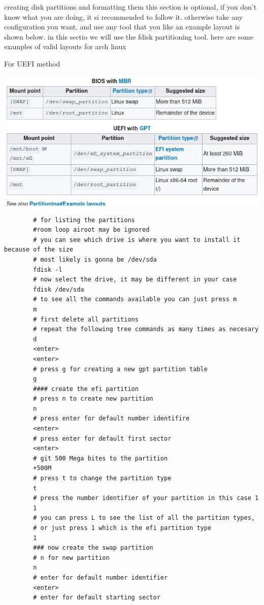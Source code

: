 \newpage
\begin{section}{creating disk partitions and formatting them}
	this section is optional, if you don't know what you are doing, it si recommended to follow it.
	otherwise take any configuration you want, and use any tool that you like
	an example layout is shown below.
	in this sectio we will use the fdisk partitioning tool.
	here are some examples of valid layouts for arch linux
	\begin{Large}
		\begin{center}
			For UEFI method
		\end{center}
	\end{Large}
	\includegraphics{partitionTablesExamples.png}
	\begin{verbatim}
		# for listing the partitions
		#room loop airoot may be ignored
		# you can see which drive is where you want to install it because of the size
		# most likely is gonna be /dev/sda
		fdisk -l
		# now select the drive, it may be different in your case
		fdisk /dev/sda
		# to see all the commands available you can just press m
		m
		# first delete all partitions
		# repeat the following tree commands as many times as necesary
		d
		<enter>
		<enter>
		# press g for creating a new gpt partition table
		g
		#### create the efi partition 
		# press n to create new partition
		n
		# press enter for default number identifire
		<enter>
		# press enter for default first sector
		<enter>
		# git 500 Mega bites to the partition
		+500M
		# press t to change the partition type
		t
		# press the number identifier of your partition in this case 1
		1
		# you can press L to see the list of all the partition types,
		# or just press 1 which is the efi partition type
		1
		### now create the swap partition
		# n for new partition
		n
		# enter for default number identifier
		<enter>
		# enter for default starting sector

\end{verbatim}
\end{section}
